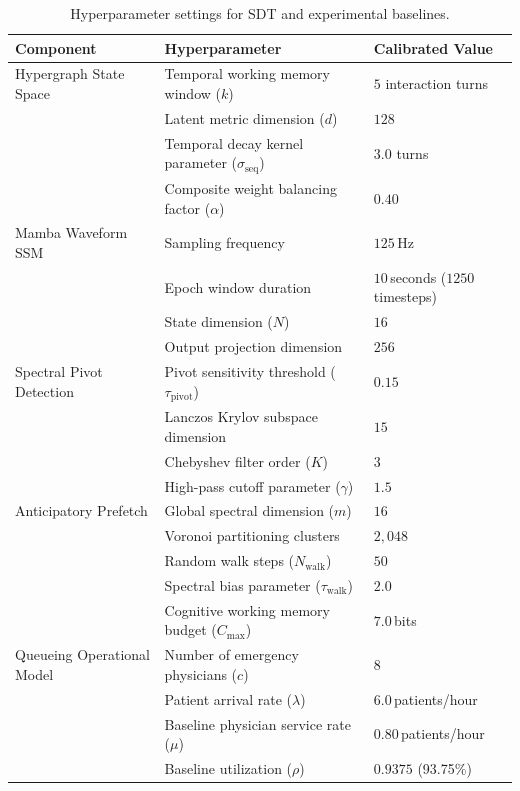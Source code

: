 \documentclass[11pt]{article}
\begin{document}
\begin{table}[h!]
  \centering
  \small
  \caption{Hyperparameter settings for SDT and experimental baselines.}
  \begin{tabular}{@{}lll@{}}
    \toprule
    \textbf{Component} & \textbf{Hyperparameter} & \textbf{Calibrated Value} \\
    \midrule
    Hypergraph State Space & Temporal working memory window ($k$) & $5$ interaction turns \\
    & Latent metric dimension ($d$) & $128$ \\
    & Temporal decay kernel parameter ($\sigma_{\text{seq}}$) & $3.0$ turns \\
    & Composite weight balancing factor ($\alpha$) & $0.40$ \\
    \midrule
    Mamba Waveform SSM & Sampling frequency & $125$\,Hz \\
    & Epoch window duration & $10$\,seconds ($1250$ timesteps) \\
    & State dimension ($N$) & $16$ \\
    & Output projection dimension & $256$ \\
    \midrule
    Spectral Pivot Detection & Pivot sensitivity threshold ($\tau_{\text{pivot}}$) & $0.15$ \\
    & Lanczos Krylov subspace dimension & $15$ \\
    & Chebyshev filter order ($K$) & $3$ \\
    & High-pass cutoff parameter ($\gamma$) & $1.5$ \\
    \midrule
    Anticipatory Prefetch & Global spectral dimension ($m$) & $16$ \\
    & Voronoi partitioning clusters & $2{,}048$ \\
    & Random walk steps ($N_{\text{walk}}$) & $50$ \\
    & Spectral bias parameter ($\tau_{\text{walk}}$) & $2.0$ \\
    & Cognitive working memory budget ($C_{\max}$) & $7.0$\,bits \\
    \midrule
    Queueing Operational Model & Number of emergency physicians ($c$) & $8$ \\
    & Patient arrival rate ($\lambda$) & $6.0$\,patients/hour \\
    & Baseline physician service rate ($\mu$) & $0.80$\,patients/hour \\
    & Baseline utilization ($\rho$) & $0.9375$ (93.75\%) \\
    \bottomrule
  \end{tabular}
\end{table}
\end{document}
